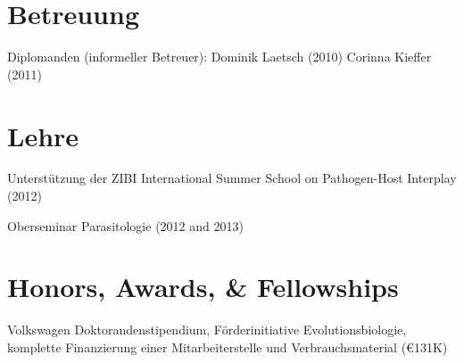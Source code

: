 \documentclass[10pt,a4paper]{article}
\renewenvironment{itemize}{
  \begin{list}{}{
    \setlength{\leftmargin}{2.5em}
    \setlength{\itemsep}{0.25em}
    \setlength{\parskip}{0pt}
    \setlength{\parsep}{0.25em}
  }
}{
  \end{list}
}
\begin{document}
\section*{Betreuung}
\begin{itemize}
\item Diplomanden (informeller Betreuer):\newline
  Dominik Laetsch (2010)\newline
  Corinna Kieffer (2011)
\end{itemize}

\section*{Lehre}
\begin{itemize}
\item Unterst\"utzung der ZIBI International Summer School on Pathogen-Host
  Interplay (2012)
\item Oberseminar Parasitologie (2012 and 2013)
\end{itemize}

\section*{Honors, Awards, \& Fellowships}

\begin{itemize}
\item [2008] Volkswagen Doktorandenstipendium, F\"orderinitiative
  Evolutionsbiologie, komplette Finanzierung einer Mitarbeiterstelle
  und Verbrauchsmaterial (\euro 131K)
\end{itemize}



\end{document}
